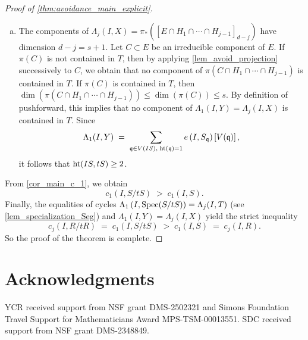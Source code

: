 \documentclass[a4paper, 11pt]{amsart}
\newcommand{\qq}{{\mathfrak{q}}}
\newcommand{\HT}{\normalfont\text{ht}}
\newcommand{\Spec}{\normalfont\text{Spec}}
\theoremstyle{definition}
\begin{document}
\begin{proof}[Proof of \autoref{thm:avoidance_main_explicit}]
\begin{enumerate}[(a)]
			\item 	The components of $\Lambda_j(I, X) = \pi_*([E \cap H_1 \cap \cdots \cap H_{j-1}]_{d-j})$ have dimension $d-j=s+1$.
			Let $C \subset E$ be an irreducible component of $E$.
			If $\pi(C)$ is not contained in $T$, then by applying \autoref{lem_avoid_projection} successively to $C$, we obtain that no component of $ \pi(C \cap H_1 \cap \cdots \cap H_{j-1})$ is contained in $T$. 
			If $\pi(C)$ is contained in $T$, then $\dim(\pi(C \cap H_1 \cap \cdots \cap H_{j-1})) \le \dim(\pi(C)) \le s$.
			By definition of pushforward, this implies that no component of $\Lambda_1\left(I, Y\right)=\Lambda_j(I, X)$ is contained in $T$.
			Since 	
			$$
			\Lambda_1(I, Y) \;=\; \sum_{\qq\in V(IS), \; \HT(\qq)=1}
			e\left(I,S_\qq\right)\left[V(\qq)\right],
			$$
			it follows that $\HT(IS, tS) \ge 2$.
		\end{enumerate}
		From \autoref{cor_main_c_1}, we obtain
		$$
		c_1(I, S/tS) \;>\; c_1(I, S).
		$$
		Finally, the equalities of cycles $\Lambda_1\left(I, \Spec(S/tS)\right) = \Lambda_j(I, T)$ (see \autoref{lem_specialization_Seg}) and $\Lambda_1(I,  Y) = \Lambda_j(I, X)$ yield the strict inequality 
		$$
		c_j(I, R/tR) \;=\; c_1(I, S/tS) \;>\; c_1(I, S) \;=\; c_j(I, R).
		$$
		So the proof of the theorem is complete. 
	\end{proof}
	
	
	
	
	\section*{Acknowledgments}
	
	YCR received support from NSF grant DMS-2502321 and Simons Foundation Travel Support for
	Mathematicians Award MPS-TSM-00013551.
	SDC received support from NSF grant DMS-2348849.
	
	
	
	
\end{document}
